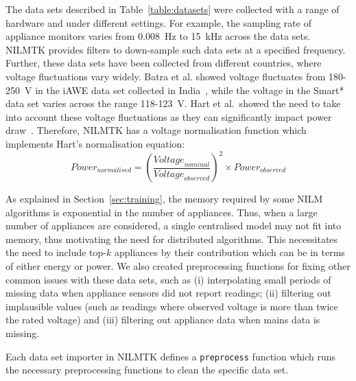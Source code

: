 \documentclass{sig-alternate}
\newcommand{\redcolor}[1]{\textcolor{red}{#1}}
\newcommand{\secref}[1]{Section~\ref{#1}}
\newcommand{\tabref}[1]{Table~\ref{#1}}
\begin{document}
\noindent
The data sets described in \tabref{table:datasets} were collected with
a range of hardware and under different settings. For example, the
sampling rate of appliance monitors varies from 0.008~Hz to 15~kHz
across the data sets.  NILMTK provides filters to down-sample such
data sets at a specified frequency. Further, these data sets have been
collected from different countries, where voltage fluctuations vary
widely. Batra et al. showed voltage fluctuates from 180-250~V in the
iAWE data set collected in India~\cite{iawe}, while the voltage in the
Smart* data set varies across the range 118-123~V. Hart et al.\ showed
the need to take into account these voltage fluctuations as they can
significantly impact power draw~\cite{hart_1992}. Therefore, NILMTK
has a voltage normalisation function which implements Hart's
normalisation equation:
\begin{equation}
\textit{Power}_{\textit{normalised}} = 
\left(\frac{\textit{Voltage}_{\textit{nominal}}}{\textit{Voltage}_{\textit{observed}}}\right)^2 
\times \textit{Power}_{\textit{observed}}
\end{equation}

As explained in \secref{sec:training}, the memory required by some
NILM algorithms is exponential in the number of appliances. Thus, when
a large number of appliances are considered, a single centralised
model may not fit into memory, thus motivating the need for
distributed algorithms. This necessitates the need to include top-$k$
appliances by their contribution which can be in terms of either
energy or power.  We also created preprocessing functions for fixing
other common issues with these data sets, such as (i) interpolating
small periods of missing data when appliance sensors did not report
readings; (ii) filtering out implausible values (such as readings
where observed voltage is more than twice the rated voltage) and (iii)
filtering out appliance data when mains data is missing.

Each data set importer in NILMTK defines a \texttt{preprocess}
function which runs the necessary preprocessing functions to clean
the specific data set.
\end{document}
